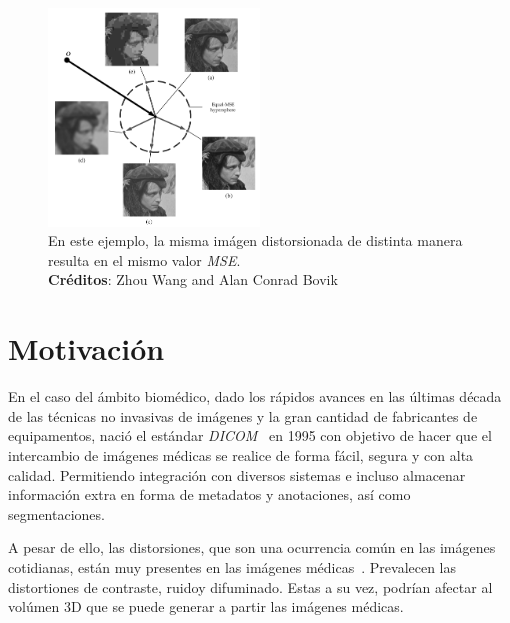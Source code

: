\begin{figure}[H]
  \begin{center}
    \includegraphics[width=0.5\textwidth]{imagenes/MSE_Hypersphere.png}
  \end{center}
  \caption{En este ejemplo, la misma imágen distorsionada de distinta manera 
  resulta en el mismo valor \emph{MSE}. \\\hspace{\textwidth}
  \textbf{Créditos}: Zhou Wang and Alan Conrad Bovik~\cite{Wang2006ModernIQ}}
  \label{fig:MSEHyperSphere}
\end{figure}


\section{Motivación}
\par 
En el caso del ámbito biomédico, dado los rápidos avances en las últimas década
de las técnicas no invasivas de imágenes y la gran cantidad de fabricantes 
de equipamentos, nació el estándar \emph{DICOM}~\cite{Parisot1995} en 1995 
con objetivo de hacer que el intercambio de imágenes médicas se realice de forma 
fácil, segura y con alta calidad. Permitiendo integración con diversos sistemas e 
incluso almacenar información extra en forma de metadatos y anotaciones, así como segmentaciones.
\par 
{}
\par 
A pesar de ello, las distorsiones, que son una ocurrencia común en las imágenes cotidianas, 
están muy presentes en las imágenes médicas~\cite{MedicalImpactOfDistortions}.
Prevalecen las distortiones de contraste, ruido\footnotemark[3] y difuminado.
Estas a su vez, podrían afectar al volúmen 3D que se puede generar a partir 
las imágenes médicas.
